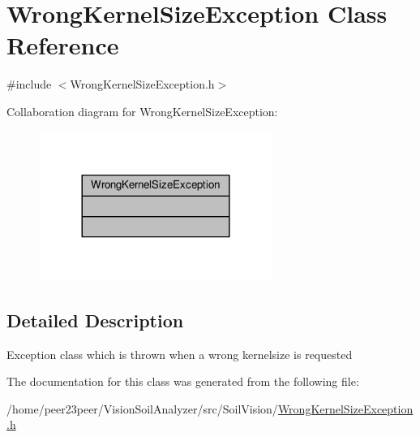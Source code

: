 \hypertarget{class_wrong_kernel_size_exception}{}\section{Wrong\+Kernel\+Size\+Exception Class Reference}
\label{class_wrong_kernel_size_exception}


{\ttfamily \#include $<$Wrong\+Kernel\+Size\+Exception.\+h$>$}



Collaboration diagram for Wrong\+Kernel\+Size\+Exception\+:\nopagebreak
\begin{figure}[H]
\begin{center}
\leavevmode
\includegraphics[width=216pt]{class_wrong_kernel_size_exception__coll__graph}
\end{center}
\end{figure}


\subsection{Detailed Description}
Exception class which is thrown when a wrong kernelsize is requested 

The documentation for this class was generated from the following file\+:\begin{DoxyCompactItemize}
\item 
/home/peer23peer/\+Vision\+Soil\+Analyzer/src/\+Soil\+Vision/\hyperlink{_wrong_kernel_size_exception_8h}{Wrong\+Kernel\+Size\+Exception.\+h}\end{DoxyCompactItemize}
